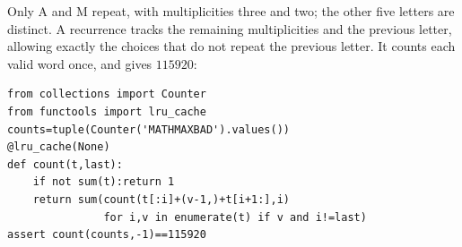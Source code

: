 Only A and M repeat, with multiplicities three and two; the other five letters are distinct. A recurrence tracks the remaining multiplicities and the previous letter, allowing exactly the choices that do not repeat the previous letter. It counts each valid word once, and gives $\boxed{115920}$:
\begin{verbatim}
from collections import Counter
from functools import lru_cache
counts=tuple(Counter('MATHMAXBAD').values())
@lru_cache(None)
def count(t,last):
    if not sum(t):return 1
    return sum(count(t[:i]+(v-1,)+t[i+1:],i)
               for i,v in enumerate(t) if v and i!=last)
assert count(counts,-1)==115920
\end{verbatim}
